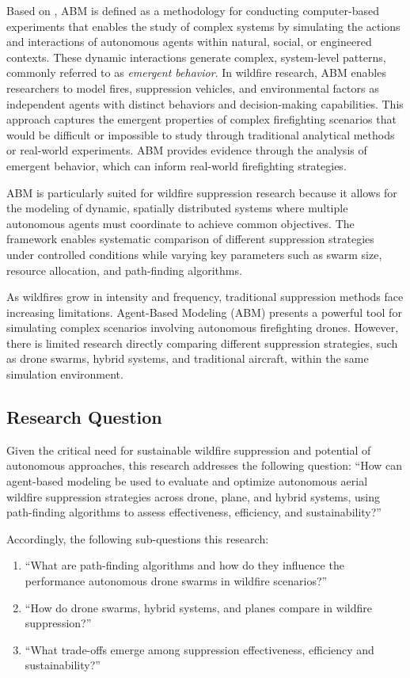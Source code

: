 \documentclass[11pt, a4paper]{article}
\begin{document}
Based on \citet{wilensky2015introduction}, ABM is defined as a methodology for conducting computer-based experiments that enables the study of complex systems by simulating the actions and interactions of autonomous agents within natural, social, or engineered contexts. These dynamic interactions generate complex, system-level patterns, commonly referred to as \textit{emergent behavior}. In wildfire research, ABM enables researchers to model fires, suppression vehicles, and environmental factors as independent agents with distinct behaviors and decision-making capabilities. This approach captures the emergent properties of complex firefighting scenarios that would be difficult or impossible to study through traditional analytical methods or real-world experiments. ABM provides evidence through the analysis of emergent behavior, which can inform real-world firefighting strategies.

ABM is particularly suited for wildfire suppression research because it allows for the modeling of dynamic, spatially distributed systems where multiple autonomous agents must coordinate to achieve common objectives. The framework enables systematic comparison of different suppression strategies under controlled conditions while varying key parameters such as swarm size, resource allocation, and path-finding algorithms.

As wildfires grow in intensity and frequency, traditional suppression methods face increasing limitations. Agent-Based Modeling (ABM) presents a powerful tool for simulating complex scenarios involving autonomous firefighting drones. However, there is limited research directly comparing different suppression strategies, such as drone swarms, hybrid systems, and traditional aircraft, within the same simulation environment.

\subsection{Research Question}
Given the critical need for sustainable wildfire suppression and potential of autonomous approaches, this research addresses the following question:
\indent \enquote{How can agent-based modeling be used to evaluate and optimize autonomous aerial wildfire suppression strategies across drone, plane, and hybrid systems, using path-finding algorithms to assess effectiveness, efficiency, and sustainability?}

Accordingly, the following sub-questions this research:
\begin{enumerate}
  \item ``What are path-finding algorithms and how do they influence the performance autonomous drone swarms in wildfire scenarios?''
  \item ``How do drone swarms, hybrid systems, and planes compare in wildfire suppression?''
  \item ``What trade-offs emerge among suppression effectiveness, efficiency and sustainability?''
\end{enumerate}
\end{document}
